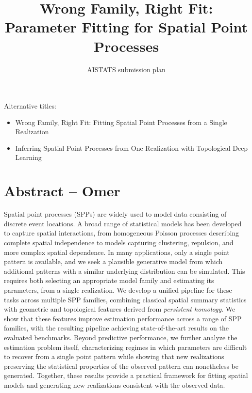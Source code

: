 \documentclass[11pt]{article}
\title{Wrong Family, Right Fit: Parameter Fitting for Spatial Point Processes}
\author{AISTATS submission plan}
\date{}
\begin{document}
\maketitle
\thispagestyle{empty}

Alternative titles:
\begin{itemize}
\item Wrong Family, Right Fit: Fitting Spatial Point Processes from a Single Realization
\item Inferring Spatial Point Processes from One Realization with Topological Deep Learning
\end{itemize}

\section{Abstract -- Omer}

Spatial point processes (SPPs) are widely used to model data consisting of discrete event locations. A broad range of statistical models has been developed to capture spatial interactions, from homogeneous Poisson processes describing complete spatial independence to models capturing clustering, repulsion, and more complex spatial dependence. In many applications, only a single point pattern is available, and we seek a plausible generative model from which additional patterns with a similar underlying distribution can be simulated. This requires both selecting an appropriate model family and estimating its parameters, from a single realization. We develop a unified pipeline for these tasks across multiple SPP families, combining classical spatial summary statistics with geometric and topological features derived from \emph{persistent homology}. 
We show that these features improve estimation performance across a range of SPP families, with the resulting pipeline achieving state-of-the-art results on the evaluated benchmarks.
Beyond predictive performance, we further analyze the estimation problem itself, characterizing regimes in which parameters are difficult to recover from a single point pattern while showing that new realizations preserving the statistical properties of the observed pattern can nonetheless be generated. Together, these results provide a practical framework for fitting spatial models and generating new realizations consistent with the observed data.

\end{document}
